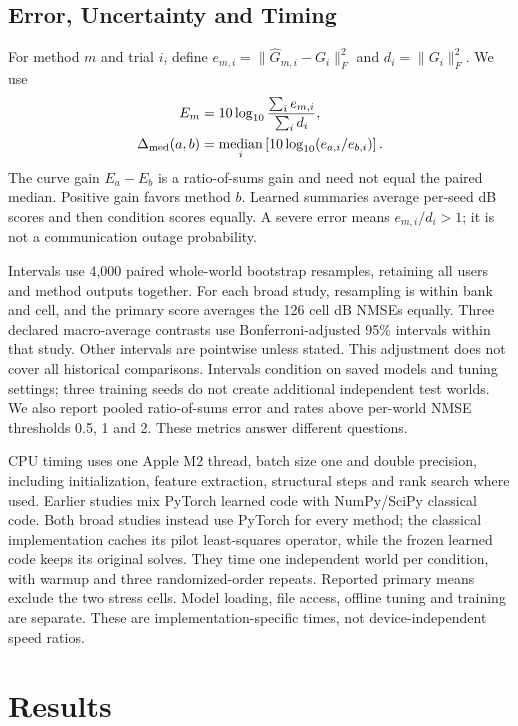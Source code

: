 \documentclass[10pt,journal,letterpaper]{IEEEtran}
\DeclareMathOperator{\median}{median}
\begin{document}
\subsection{Error, Uncertainty and Timing}
For method $m$ and trial $i$, define $e_{m,i}=\|\widehat G_{m,i}-G_i\|_F^2$ and $d_i=\|G_i\|_F^2$. We use
\begin{align}
 E_m&=10\log_{10}\frac{\sum_i e_{m,i}}{\sum_i d_i},\label{eq:nmse}\\
 \Delta_{\rm med}(a,b)&=\median_i\left[10\log_{10}(e_{a,i}/e_{b,i})\right].
\end{align}
The curve gain $E_a-E_b$ is a ratio-of-sums gain and need not equal the paired median. Positive gain favors method $b$. Learned summaries average per-seed dB scores and then condition scores equally. A severe error means $e_{m,i}/d_i>1$; it is not a communication outage probability.

Intervals use 4,000 paired whole-world bootstrap resamples, retaining all users and method outputs together. For each broad study, resampling is within bank and cell, and the primary score averages the 126 cell dB NMSEs equally. Three declared macro-average contrasts use Bonferroni-adjusted 95\% intervals within that study. Other intervals are pointwise unless stated. This adjustment does not cover all historical comparisons. Intervals condition on saved models and tuning settings; three training seeds do not create additional independent test worlds. We also report pooled ratio-of-sums error and rates above per-world NMSE thresholds 0.5, 1 and 2. These metrics answer different questions.

CPU timing uses one Apple M2 thread, batch size one and double precision, including initialization, feature extraction, structural steps and rank search where used. Earlier studies mix PyTorch learned code with NumPy/SciPy classical code. Both broad studies instead use PyTorch for every method; the classical implementation caches its pilot least-squares operator, while the frozen learned code keeps its original solves. They time one independent world per condition, with warmup and three randomized-order repeats. Reported primary means exclude the two stress cells. Model loading, file access, offline tuning and training are separate. These are implementation-specific times, not device-independent speed ratios.

\section{Results}
\end{document}

